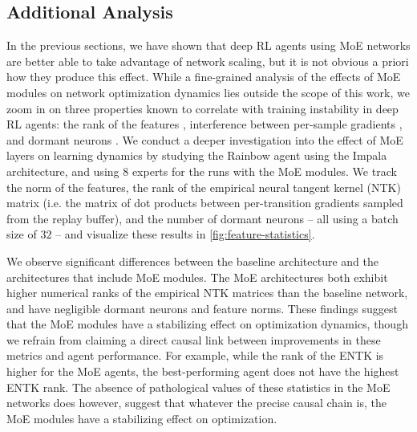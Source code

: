 \documentclass{article}
\theoremstyle{plain}
\theoremstyle{definition}
\theoremstyle{remark}
\begin{document}
\subsection{Additional Analysis}
\label{sec:analyses}
In the previous sections, we have shown that deep RL agents using MoE networks are better able to take advantage of network scaling, but it is not obvious a priori how they produce this effect. While a fine-grained analysis of the effects of MoE modules on network optimization dynamics lies outside the scope of this work, we zoom in on three properties known to correlate with training instability in deep RL agents: the rank of the features \citep{kumar2021implicit}, interference between per-sample gradients \citep{lyle2022learning}, and dormant neurons \citep{sokar2023dormant}. We conduct a deeper investigation into the effect of MoE layers on learning dynamics by studying the Rainbow agent using the Impala architecture, and using 8 experts for the runs with the MoE modules. We track the norm of the features, the rank of the empirical neural tangent kernel (NTK) matrix (i.e. the matrix of dot products between per-transition gradients sampled from the replay buffer), and the number of dormant neurons -- all using a batch size of $32$ -- and visualize these results 
in \cref{fig:feature-statistics}. 

We observe significant differences between the baseline architecture and the architectures that include MoE modules. The MoE architectures both exhibit higher numerical ranks of the empirical NTK matrices than the baseline network, and have negligible dormant neurons and feature norms. These findings suggest that the MoE modules have a stabilizing effect on optimization dynamics, though we refrain from claiming a direct causal link between improvements in these metrics and agent performance. For example, while the rank of the ENTK is higher for the MoE agents, the best-performing agent does not have the highest ENTK rank. The absence of pathological values of these statistics in the MoE networks does however, suggest that whatever the precise causal chain is, the MoE modules have a stabilizing effect on optimization.
\end{document}
